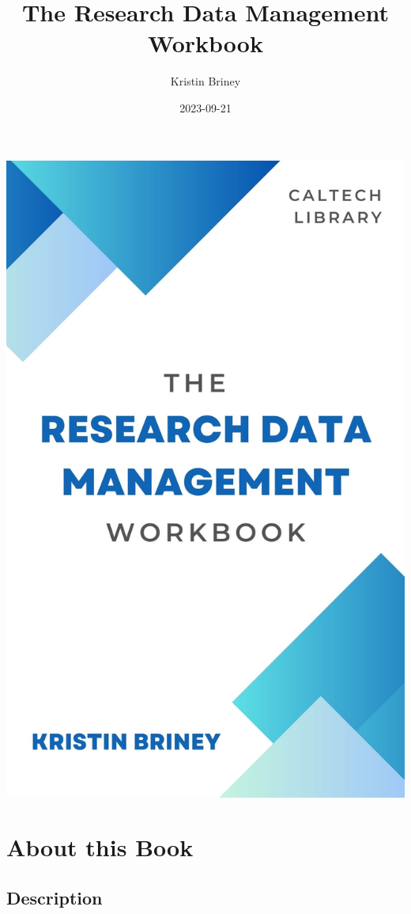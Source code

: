 \documentclass[
]{book}
\title{The Research Data Management Workbook}
\author{Kristin Briney}
\date{2023-09-21}
\begin{document}
\maketitle

\includegraphics{./images/cover.jpg}

{
\setcounter{tocdepth}{1}
\tableofcontents
}
\hypertarget{about-this-book}{%
\chapter*{About this Book}\label{about-this-book}}

\hypertarget{description}{%
\section*{Description}\label{description}}
\end{document}
